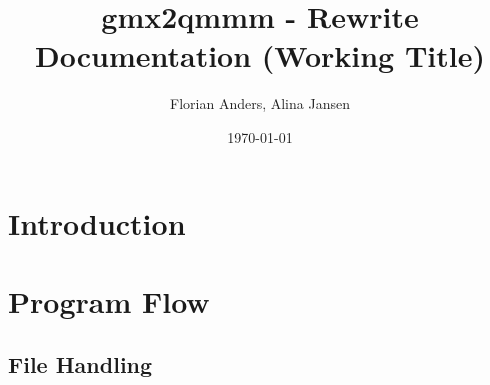 \documentclass[10pt,a4paper]{article}
\author{Florian Anders, Alina Jansen}
\date{\today}
\title{gmx2qmmm - Rewrite Documentation (Working Title)}
\begin{document}
\maketitle

\newpage

\section{Introduction}

\section{Program Flow}

\subsection{File Handling}
\end{document}
